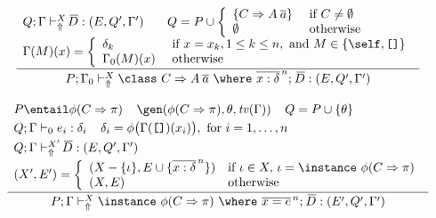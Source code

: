 \begin{figure}
\begin{mdframed}
\[ \begin{array}{cc}
	\displaystyle\frac
	 {\begin{array}{ll}
            Q;\Gamma \vdash_{\Uparrow}^X \overline{\!D} : (E, Q', \Gamma') \:\: & \:\:
            Q = P \cup \left\{ \begin{array}{ll}
                                  \{ C \Rightarrow A\:\overline{a} \} & \text{ if } C \not= \emptyset \\
                                  \emptyset                              & \text{ otherwise}
                                \end{array}\right. \\
            \multicolumn{2}{c}{
                \Gamma(M)(x) = \left\{ \begin{array}{ll}
                                 \delta_k       & \text{ if } x = x_k, 1 \leq k \leq n, \text{ and } 
                                                              M \in \{ \self, \texttt{[]} \}\\
                                 \Gamma_0(M)(x) & \text{ otherwise} 
                               \end{array}\right. }
          \end{array}}
	 {P;\Gamma_0 \vdash_{\Uparrow}^X \class\ C \Rightarrow A\: \overline{a}\ \where\ \overline{x:\delta}^{\,n};\: \overline{\!D} : 
            (E, Q', \Gamma') } \\\ \\

	\displaystyle\frac
	 {\begin{array}{l}
               P \entail \phi(C \Rightarrow \pi) \:\:\:\:\:
               \gen(\phi(C\Rightarrow \pi), \theta, \tv(\Gamma)) \:\:\:\:\:
               Q = P \cup \{ \theta \} \:\:\: \\[.1cm]
               Q;\Gamma \vdash_0 e_i : \delta_i \:\:\:\:\: 
               \delta_i = \phi\bigl(\Gamma(\texttt{[]})(x_i)\bigr), \text{ for } i=1,\ldots, n\\[.1cm]
               Q;\Gamma \vdash_{\Uparrow}^{X'} \overline{\!D} : (E,Q',\Gamma') \\[.1cm]
               (X',E') = \left\{ \begin{array}{ll}
                               (X - \{ \iota \}, E \cup \{ \overline{x : \delta}^{\,n} \}) 
                                   & \text{if } \iota \in X,\, \iota = \instance\ \phi(C \Rightarrow \pi) \\
                               (X, E) & \text{otherwise} 
                             \end{array}\right.
          \end{array}}
	 {P;\Gamma \vdash_{\Uparrow}^X \instance\ \phi(C \Rightarrow \pi)\ \where\ \overline{x = e}^{\,n};\: \overline{\!D}
             : (E',Q',\Gamma')}\\\ \\


\end{array}\]
\end{mdframed}
\end{figure}
